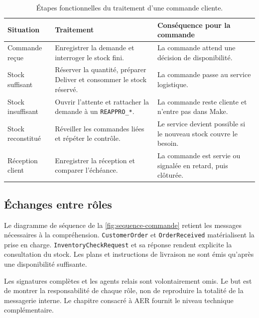 \begin{table}[H]
  \centering
  \begin{tabularx}{\textwidth}{L{0.22\textwidth} Y Y}
    \toprule
    Situation & Traitement & Conséquence pour la commande \\
    \midrule
    Commande reçue & Enregistrer la demande et interroger le stock fini. & La commande attend une décision de disponibilité. \\
    Stock suffisant & Réserver la quantité, préparer Deliver et consommer le stock réservé. & La commande passe au service logistique. \\
    Stock insuffisant & Ouvrir l'attente et rattacher la demande à un \texttt{REAPPRO\_*}. & La commande reste cliente et n'entre pas dans Make. \\
    Stock reconstitué & Réveiller les commandes liées et répéter le contrôle. & Le service devient possible si le nouveau stock couvre le besoin. \\
    Réception client & Enregistrer la réception et comparer l'échéance. & La commande est servie ou signalée en retard, puis clôturée. \\
    \bottomrule
  \end{tabularx}
  \caption{Étapes fonctionnelles du traitement d'une commande cliente.}
  \label{tab:etats-commande}
\end{table}

\subsection{Échanges entre rôles}

Le diagramme de séquence de la \cref{fig:sequence-commande} retient les messages nécessaires à la compréhension. \texttt{CustomerOrder} et \texttt{OrderReceived} matérialisent la prise en charge. \texttt{InventoryCheckRequest} et sa réponse rendent explicite la consultation du stock. Les plans et instructions de livraison ne sont émis qu'après une disponibilité suffisante.


Les signatures complètes et les agents relais sont volontairement omis. Le but est de montrer la responsabilité de chaque rôle, non de reproduire la totalité de la messagerie interne. Le chapitre consacré à AER fournit le niveau technique complémentaire.

